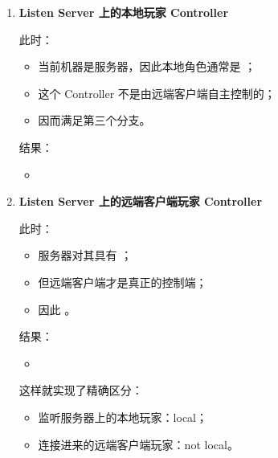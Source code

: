 \begin{enumerate}
	\subsection{Listen Server 下的理解}
	
	Listen Server 同时具备两种身份：
	
	\begin{itemize}
		\item 它是服务器；
		\item 它又承载一个本地玩家。
	\end{itemize}
	
	因此在 Listen Server 中， 能很好地区分两类 Controller。
	
	\item \textbf{Listen Server 上的本地玩家 Controller}
	
	此时：
	
	\begin{itemize}
		\item 当前机器是服务器，因此本地角色通常是 ；
		\item 这个 Controller 不是由远端客户端自主控制的；
		\item 因而满足第三个分支。
	\end{itemize}
	
	结果：
	
	\begin{itemize}
		\item {}
	\end{itemize}
	
	\item \textbf{Listen Server 上的远端客户端玩家 Controller}
	
	此时：
	
	\begin{itemize}
		\item 服务器对其具有 ；
		\item 但远端客户端才是真正的控制端；
		\item 因此 。
	\end{itemize}
	
	结果：
	
	\begin{itemize}
		\item {}
	\end{itemize}
	
	这样就实现了精确区分：
	
	\begin{itemize}
		\item 监听服务器上的本地玩家：local；
		\item 连接进来的远端客户端玩家：not local。
	\end{itemize}
\end{enumerate}

